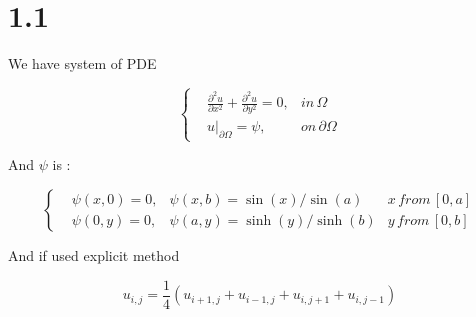 

\section*{1.1}

We have system of PDE

\begin{equation}
    \left\{
    \begin{matrix}
    &\frac{\partial^2 u}{\partial x^2} + \frac{\partial^2 u}{\partial y^2} = 0, & in \,  \Omega \, \\
    &u|_{\partial\Omega} = \psi, & on \, \partial \Omega 
    \end{matrix}
    \right.
\end{equation}

And $\psi$ is :

\begin{equation}
\left\{
\begin{matrix}
    &\psi(x,0) = 0, & \psi(x,b) = \sin(x)/\sin(a) & x\, from\, [0,a] \\
    &\psi(0,y) = 0 , & \psi(a,y) = \sinh(y) / \sinh(b) & y\, from \, [0,b]
    \end{matrix}
    \right.
\end{equation}

And if used explicit method

\begin{equation}
    u_{i, j} = \frac{1}{4} (u_{i+1,j} + u_{i-1,j} + u_{i,j+1} + u_{i,j-1}) 
\end{equation}

\begin{figure}[h!]
\end{figure}


